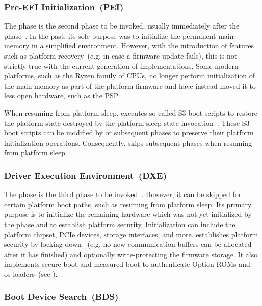 \subsubsection{Pre-EFI Initialization~(PEI)}

The  phase is the second phase to be invoked, usually immediately after the  phase~\cite{pi-spec}. In the past, its sole purpose was to initialize the permanent main memory in a simplified environment. However, with the introduction of features such as platform recovery~(e.g. in case a \gls{firmware} update fails), this is not strictly true with the current generation of  implementations. Some modern platforms, such as the  Ryzen family of \glspl{CPU}, no longer perform initialization of the main memory as part of the platform \gls{firmware} and have instead moved it to less open hardware, such as the  \gls{PSP}~\cite{ryzen-ram-init}.

When resuming from platform sleep,  executes so-called S3 boot scripts to restore the platform state destroyed by the platform sleep state invocation~\cite{pi-spec}. These S3 boot scripts can be modified by  or subsequent phases to preserve their platform initialization operations. Consequently,  skips subsequent phases when resuming from platform sleep.

\subsubsection{Driver Execution Environment~(DXE)}

The  phase is the third phase to be invoked~\cite{pi-spec}. However, it can be skipped for certain platform boot paths, such as resuming from platform sleep. Its primary purpose is to initialize the remaining hardware which was not yet initialized by the  phase and to establish platform security. Initialization can include the platform chipset, PCIe devices, storage interfaces, and more.  establishes platform security by locking down ~(e.g. no new  communication buffers can be allocated after it has finished) and optionally write-protecting the \gls{firmware} storage. It also implements \gls{secure-boot} and \gls{measured-boot} to authenticate Option ROMs and \glspl{os-loader}~(see ).

\subsubsection{Boot Device Search~(BDS)}

